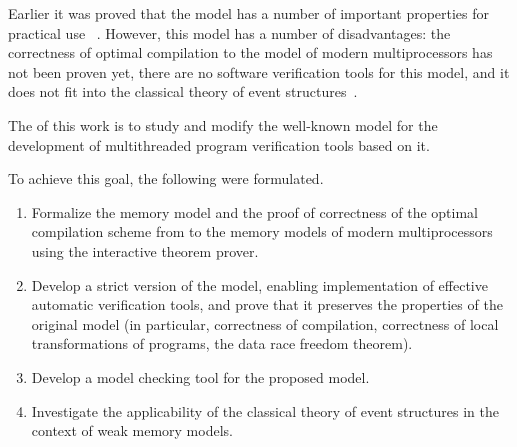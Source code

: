 
Earlier it was proved that the \Wkm model has a number of important properties for practical use%
~\autocite{Chakraborty-Vafeiadis:POPL19}.
However, this model has a number of disadvantages:
the correctness of optimal compilation to the model of modern multiprocessors has not been proven yet, 
there are no software verification tools for this model,
and it does not fit into the classical theory of event structures~\cite{Winskel:86}.


The {\aim} of this work is to study and modify the well-known \Wkm model for the development of multithreaded program verification tools based on it.


To achieve this goal, the following {\tasks} were formulated.
\begin{enumerate}[beginpenalty=10000] %
   \item
Formalize the \Wkm memory model and the proof of correctness of the optimal compilation scheme from \Wkm to the memory models of modern multiprocessors using the \coq interactive theorem prover.
   \item
Develop a strict version of the \Wkm model,
enabling implementation of effective automatic verification tools, 
and prove that it preserves the properties of the original \Wkm model 
(in particular, correctness of compilation, correctness of local transformations of programs,
the data race freedom theorem).
   \item
Develop a model checking tool for the proposed model.
   \item 
Investigate the applicability of the classical theory of event structures in the context of weak memory models.
\end{enumerate}

